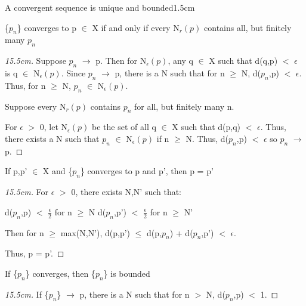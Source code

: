     \begin{ltheorem}{A convergent sequence is unique and bounded}{1.5cm}
        \item \{$p_n$\} converges to p $\in$ X if and only if
            every N$_r(p)$ contains all, but finitely many $p_n$

            \begin{proof}[15.5cm]
                Suppose $p_n$ $\rightarrow$ p.
                Then for N$_{\epsilon}(p)$, any q $\in$ X such that
                d(q,p) $<$ $\epsilon$ is q $\in$ N$_{\epsilon}(p)$.
                Since $p_n$ $\rightarrow$ p, there is a N such that for
                n $\geq$ N, d($p_n$,p) $<$ $\epsilon$.
                Thus, for n $\geq$ N, $p_n$ $\in$ N$_{\epsilon}(p)$.

                Suppose every N$_r(p)$ contains $p_n$ for all, but finitely
                many n.

                For $\epsilon$ $>$ 0, let N$_{\epsilon}(p)$ be the set of
                all q $\in$ X such that d(p,q) $<$ $\epsilon$.
                Thus, there exists a N such that $p_n$ $\in$ N$_{\epsilon}(p)$
                if n $\geq$ N.
                Thus, d($p_n$,p) $<$ $\epsilon$ so $p_n$ $\rightarrow$ p.
            \end{proof}

        \item If p,p' $\in$ X and \{$p_n$\} converges to p and p', then p = p'

            \begin{proof}[15.5cm]
                For $\epsilon$ $>$ 0, there exists N,N' such that:

                \hspace{1cm}
                d($p_n$,p) $<$ $\frac{\epsilon}{2}$ for n $\geq$ N
                \hspace{1cm}
                d($p_n$,p') $<$ $\frac{\epsilon}{2}$ for n $\geq$ N'

                Then for n $\geq$ max(N,N'),
                d(p,p') $\leq$ d(p,$p_n$) + d($p_n$,p') $<$ $\epsilon$.

                Thus, p = p'.
            \end{proof}

            \newpage

        \item If \{$p_n$\} converges, then \{$p_n$\} is bounded

            \begin{proof}[15.5cm]
                If \{$p_n$\} $\rightarrow$ p,
                there is a N such that for n $>$ N, d($p_n$,p) $<$ 1.


\end{proof}
\end{ltheorem}
